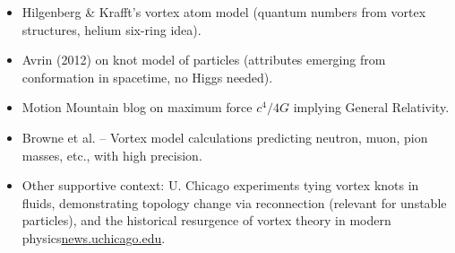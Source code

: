 \begin{itemize}
\item
Hilgenberg & Krafft’s vortex atom model (quantum numbers from vortex structures, helium six-ring idea).

\item
Avrin (2012) on knot model of particles (attributes emerging from conformation in spacetime, no Higgs needed).

\item
Motion Mountain blog on maximum force $c^4/4G$ implying General Relativity.

\item
Browne et al. – Vortex model calculations predicting neutron, muon, pion masses, etc., with high precision.

\item
Other supportive context: U. Chicago experiments tying vortex knots in fluids, demonstrating topology change via reconnection (relevant for unstable particles), and the historical resurgence of vortex theory in modern physics\href{https://news.uchicago.edu/story/vortex-loops-could-untie-knotty-physics-problems#:~:text=Vortex%20knots%20should%2C%20in%20principle%2C,%E2%80%9D}{news.uchicago.edu}.\end{itemize}
